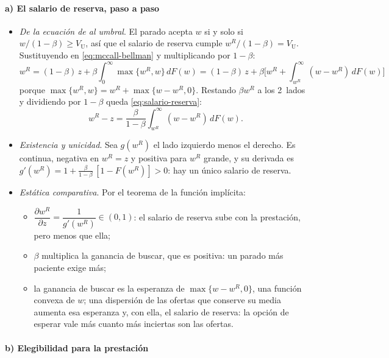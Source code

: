\documentclass[11pt]{article}
\begin{document}
\paragraph{a) El salario de reserva, paso a paso}

\begin{itemize}
\item \emph{De la ecuación de  al umbral}. El parado acepta $w$ si y solo si $w/(1-\beta)\geq V_{\mathrm U}$, así que el salario de reserva cumple $w^R/(1-\beta)=V_{\mathrm U}$. Sustituyendo en \eqref{eq:mccall-bellman} y multiplicando por $1-\beta$:
  \begin{equation*}
  w^R=(1-\beta)\,z+\beta\int_0^{\infty}\max\{w^R,w\}\,dF(w)=(1-\beta)\,z+\beta\Big[w^R+\int_{w^R}^{\infty}(w-w^R)\,dF(w)\Big]
  \end{equation*}
  porque $\max\{w^R,w\}=w^R+\max\{w-w^R,0\}$. Restando $\beta w^R$ a los 2~lados y dividiendo por $1-\beta$ queda \eqref{eq:salario-reserva}:
  \begin{equation*}
  w^R-z=\frac{\beta}{1-\beta}\int_{w^R}^{\infty}(w-w^R)\,dF(w).
  \end{equation*}
\item \emph{Existencia y unicidad}. Sea $g(w^R)$ el lado izquierdo menos el derecho. Es continua, negativa en $w^R=z$ y positiva para $w^R$ grande, y su derivada es $g'(w^R)=1+\frac{\beta}{1-\beta}\,[1-F(w^R)]>0$: hay un único salario de reserva.
\item \emph{Estática comparativa}. Por el teorema de la función implícita:
  \begin{itemize}
  \item $\dfrac{\partial w^R}{\partial z}=\dfrac{1}{g'(w^R)}\in(0,1)$: el salario de reserva sube con la prestación, pero menos que ella;
  \item $\beta$ multiplica la ganancia de buscar, que es positiva: un parado más paciente exige más;
  \item la ganancia de buscar es la esperanza de $\max\{w-w^R,0\}$, una función convexa de $w$; una dispersión de las ofertas que conserve su media aumenta esa esperanza y, con ella, el salario de reserva: la opción de esperar vale más cuanto más inciertas son las ofertas. \findemo
  \end{itemize}
\end{itemize}

\paragraph{b) Elegibilidad para la prestación}
\end{document}
